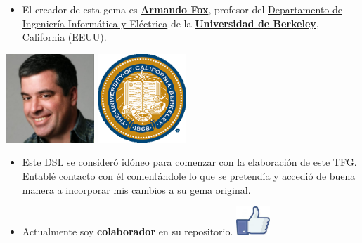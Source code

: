 \documentclass{beamer}
\begin{document}
\begin{frame}[allowframebreaks]
  \begin{itemize}
    \item El creador de esta gema es \href{http://www.armandofox.com/geek}{{\bfseries Armando Fox}}, profesor del 
    \href{http://www.cs.berkeley.edu/}{Departamento de Ingeniería Informática y Eléctrica} de la 
    \href{http://www.berkeley.edu/}{{\bfseries Universidad de Berkeley}}, California (EEUU).
  \end{itemize}
  \begin{center}
    \includegraphics[width=0.25\textwidth]{img/armando.eps}
    \hspace*{1.5cm}
    \includegraphics[width=0.25\textwidth]{img/Berkeley.eps}
  \end{center}
  \framebreak
  
  \begin{itemize}
    \item Este DSL se consideró idóneo para comenzar con la elaboración de este TFG. Entablé contacto con él comentándole lo que se pretendía y
    accedió de buena manera a incorporar mis cambios a su gema original. 
    \item Actualmente soy {\bfseries colaborador} en su repositorio. \includegraphics[width=0.1\textwidth]{img/like.eps}
  \end{itemize}
  \framebreak
  

\end{frame}
\end{document}
